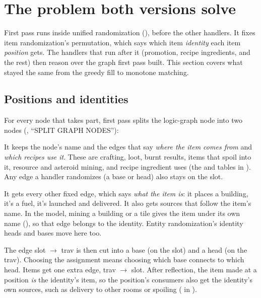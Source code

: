 \section{The problem both versions solve}
\label{sec:problem}

First pass runs inside unified randomization (), before the other handlers. It fixes item randomization's permutation, which says which item \emph{identity} each item \emph{position} gets. The handlers that run after it (promotion, recipe ingredients, and the rest) then reason over the graph first pass built. This section covers what stayed the same from the greedy fill to monotone matching.

\subsection{Positions and identities}

For every node that takes part, first pass splits the logic-graph node into two nodes (, ``SPLIT GRAPH NODES''):

\begin{description}[leftmargin=1.2em, style=nextline]
  \item[Slot (the position).] It keeps the node's name and the edges that say \emph{where the item comes from} and \emph{which recipes use it}. These are crafting, loot, burnt results, items that spoil into it, resource and asteroid mining, and recipe ingredient uses (the  and  tables in ). Any edge a handler randomizes (a base or head) also stays on the slot.
  \item[Trav (the identity), named \texttt{X-trav}.] It gets every other fixed edge, which says \emph{what the item is}: it places a building, it's a fuel, it's launched and delivered. It also gets sources that follow the item's name. In the model, mining a building or a tile gives the item under its own name (), so that edge belongs to the identity. Entity randomization's identity heads and bases move here too.
\end{description}

\noindent The edge slot $\to$ trav is then cut into a base (on the slot) and a head (on the trav). Choosing the assignment means choosing which base connects to which head. Items get one extra edge, trav $\to$ slot. After reflection, the item made at a position \emph{is} the identity's item, so the position's consumers also get the identity's own sources, such as delivery to other rooms or spoiling ( in ).

